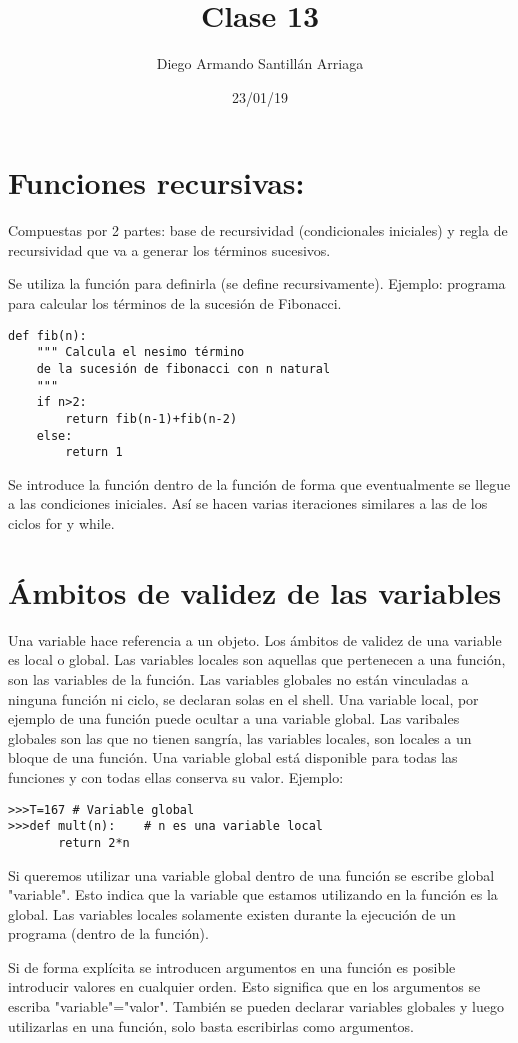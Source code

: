 \documentclass[letterpaper, 12pt, oneside]{article}%
\title{\Huge Clase 13}
\author{Diego Armando Santillán Arriaga}
\date{23/01/19}
\begin{document}
	\maketitle
	\newpage
	
\section{Funciones recursivas:}
Compuestas por 2 partes: base de recursividad (condicionales iniciales) y regla de recursividad que va a generar los términos sucesivos.

Se utiliza la función para definirla (se define recursivamente). Ejemplo: programa para calcular los términos de la sucesión de Fibonacci. 
\begin{verbatim}
def fib(n):
    """ Calcula el nesimo término
    de la sucesión de fibonacci con n natural
    """
    if n>2:
        return fib(n-1)+fib(n-2)
    else:
        return 1
\end{verbatim}
Se introduce la función dentro de la función de forma que eventualmente se llegue a las condiciones iniciales. Así se hacen varias iteraciones similares a las de los ciclos for y while.

\section{Ámbitos de validez de las variables}

Una variable hace referencia a un objeto. Los ámbitos de validez de una variable es local o global. Las variables locales son aquellas que pertenecen a una función, son las variables de la función. Las variables globales no están vinculadas a ninguna función ni ciclo, se declaran solas en el shell. 
Una variable local, por ejemplo de una función puede ocultar a una variable global.  
Las varibales globales son las que no tienen sangría, las variables locales, son locales a un bloque de una función. Una variable global está disponible para todas las funciones y con todas ellas conserva su valor. Ejemplo:
\begin{verbatim}
>>>T=167 # Variable global
>>>def mult(n):    # n es una variable local
       return 2*n    
\end{verbatim}
Si queremos utilizar una variable global dentro de una función se escribe global "variable". Esto indica que la variable que estamos utilizando en la función es la global. 
Las variables locales solamente existen durante la ejecución de un programa (dentro de la función).

Si de forma explícita se introducen argumentos en una función es posible introducir valores en cualquier orden. Esto significa que en los argumentos se escriba "variable"="valor". También se pueden declarar variables globales y luego utilizarlas en una función, solo basta escribirlas como argumentos. 
\end{document}
